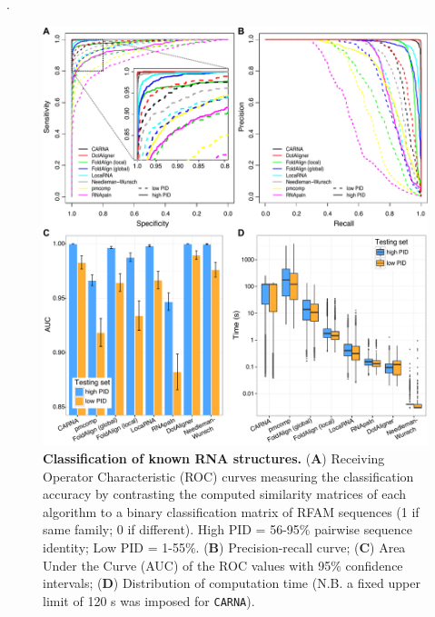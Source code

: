 \documentclass[a4paper,11pt]{article}
\newcommand\carna{\texttt{CARNA}}
\begin{document}
{\cite{robin2011proc}. \\

\begin{figure}
 \includegraphics[width=\textwidth]{fig3}
 \caption { \textbf{Classification of known RNA structures. }
 (\textbf{A}) Receiving Operator Characteristic (ROC) curves measuring the classification
 accuracy by contrasting the computed similarity matrices of each algorithm 
 to a binary classification matrix of RFAM  sequences (1 if same family; 
 0 if different). High PID =  56-95\% pairwise sequence identity; Low PID  = 1-55\%.
 (\textbf{B}) Precision-recall curve;  
 (\textbf{C}) Area Under the Curve (AUC) of the ROC values with 95\% confidence intervals; 
 (\textbf{D}) Distribution of computation time (N.B. a fixed upper limit of 120 s was 
 imposed for \carna{}). 
 }
\end{figure}

}
\end{document}
